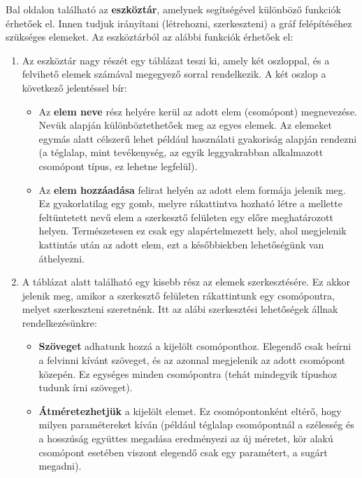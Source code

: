 Bal oldalon található az \textbf{eszköztár}, amelynek segítségével különböző funkciók érhetőek el. Innen tudjuk irányítani (létrehozni, szerkeszteni) a gráf felépítéséhez szükséges elemeket. Az eszköztárból az alábbi funkciók érhetőek el:

\begin{enumerate}
\item Az eszköztár nagy részét egy táblázat teszi ki, amely két oszloppal, és a felvihető elemek számával megegyező sorral rendelkezik. A két oszlop a következő jelentéssel bír:

\begin{itemize}
\item Az \textbf{elem neve} rész helyére kerül az adott elem (csomópont) megnevezése. Nevük alapján különböztethetőek meg az egyes elemek. Az elemeket egymás alatt célszerű lehet például használati gyakoriság alapján rendezni (a téglalap, mint tevékenység, az egyik leggyakrabban alkalmazott csomópont típus, ez lehetne legfelül).
\item Az \textbf{elem hozzáadása} felirat helyén az adott elem formája jelenik meg. Ez gyakorlatilag egy gomb, melyre rákattintva hozható létre a mellette feltüntetett nevű elem a szerkesztő felületen egy előre meghatározott helyen. Természetesen ez csak egy alapértelmezett hely, ahol megjelenik kattintás után az adott elem, ezt a későbbiekben lehetőségünk van áthelyezni.
\end{itemize}

\item A táblázat alatt található egy kisebb rész az elemek szerkesztésére. Ez akkor jelenik meg, amikor a szerkesztő felületen rákattintunk egy csomópontra, melyet szerkeszteni szeretnénk. Itt az alábi szerkesztési lehetőségek állnak rendelkezésünkre:

\begin{itemize}
\item \textbf{Szöveget} adhatunk hozzá a kijelölt csomóponthoz. Elegendő csak beírni a felvinni kívánt szöveget, és az azonnal megjelenik az adott csomópont közepén. Ez egységes minden csomópontra (tehát mindegyik típushoz tudunk írni szöveget).
\item \textbf{Átméretezhetjük} a kijelölt elemet. Ez csomópontonként eltérő, hogy milyen paramétereket kíván (például téglalap csomópontnál a szélesség és a hosszúság együttes megadása eredményezi az új méretet, kör alakú csomópont esetében viszont elegendő csak egy paramétert, a sugárt megadni).
\end{itemize}


\end{enumerate}
